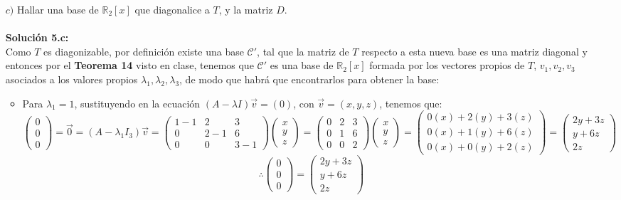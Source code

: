 \begin{itemize}
\item[$c)$] Hallar una base de $\mathbb{R}_2[x]$ 
que diagonalice a $T$, y la matriz $D$.\\\\
\textbf{Soluci\'on 5.c:}\\
Como $T$ es diagonizable, por definici\'on existe una base $\mathcal{C}'$, tal que la matriz de $T$ respecto a esta nueva base es una matriz diagonal y entonces por el \textbf{Teorema 14} visto en clase, tenemos que $\mathcal{C}'$ es una base de $\mathbb{R}_2[x]$ formada por los vectores
propios de $T$, $v_1,v_2,v_3$ asociados a los valores propios $\lambda_1,\lambda_2,\lambda_3$, de modo que habr\'a que encontrarlos para obtener la base:
\begin{itemize}
 \item Para $\lambda_1=1$, sustituyendo en la ecuaci\'on $(A-\lambda I)\vec{v}=(0)$, con $\vec{v}=(x,y,z)$, tenemos que:
    \[\begin{pmatrix}0\\
0\\0\end{pmatrix}=\vec{0}=(A-\lambda_1I_{3})\vec{v}=\begin{pmatrix}
    1-1 & 2 & 3\\
    0 & 2-1 & 6\\
    0 & 0 & 3-1\end{pmatrix}\begin{pmatrix}x\\
y\\z\end{pmatrix}=\begin{pmatrix}
    0 & 2 & 3\\
    0 & 1 & 6\\
    0 & 0 & 2\end{pmatrix}\begin{pmatrix}x\\
y\\z\end{pmatrix}=\begin{pmatrix}0(x)+2(y)+3(z)\\0(x)+1(y)+6(z)\\0(x)+0(y)+2(z)\end{pmatrix}=\begin{pmatrix}2y+3z\\y+6z\\2z\end{pmatrix}\]
\[\therefore \begin{pmatrix}0\\
0\\0\end{pmatrix}=\begin{pmatrix}2y+3z\\y+6z\\2z\end{pmatrix}\]

\end{itemize}
\end{itemize}
